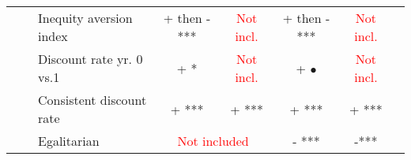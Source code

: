 \documentclass{beamer}              %
\newcommand{\RowColor}{\rowcolor{gray} \cellcolor{white}}
\begin{document}
\begin{frame}[plain]
{\begin{table}
\begin{footnotesize}
\begin{tabular}{m{0.2cm}m{0.05cm}|l|cc|ccc|}
\hline
\RowColor \cellcolor{white} & \cellcolor{white} & \cellcolor{white}Inequity aversion index& \cellcolor{white} \scriptsize + {\tiny then} -  ***& \multicolumn{1}{c}{\textcolor{red}{Not incl.}} &\cellcolor{white} \scriptsize + {\tiny then} -  ***& \multicolumn{1}{c}{\textcolor{red}{Not incl.}} \\ 
\RowColor \cellcolor{white}&\cellcolor{white}&\cellcolor{white}Discount rate yr. 0 vs.1 &\cellcolor{white} + * &\multicolumn{1}{c}{\textcolor{red}{Not incl.}} &\cellcolor{white} + $\bullet$ &\multicolumn{1}{c}{\textcolor{red}{Not incl.}}\\
&  & Consistent discount rate & + *** &+ ***&+ ***&+ *** \\
\RowColor \cellcolor{white} \multirow{-4}{*}{\rotatebox[origin=c]{90}{\textbf{\scriptsize{Behavioral}}}}& \cellcolor{white} &\cellcolor{white}Egalitarian & \multicolumn{2}{c}{\textcolor{red}{Not included}} & \cellcolor{white}- ***& \cellcolor{white}-*** \\
\hline
\end{tabular} 
\end{footnotesize}
\end{table} }
\end{frame}



\end{document}
